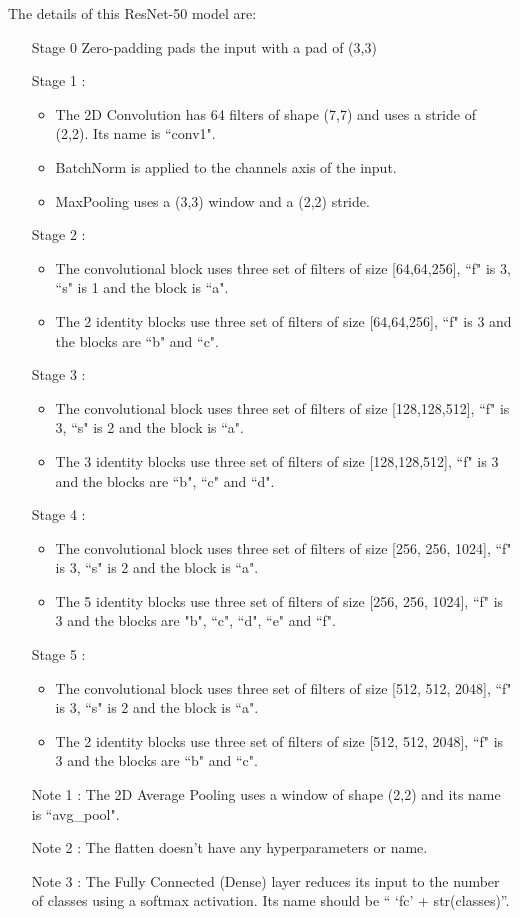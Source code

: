 \noindent The details of this ResNet-50 model are:
\begin{itemize}
\item[Stage 0] Zero-padding pads the input with a pad of (3,3)
\item[Stage 1]:
    \begin{itemize}
    \item The 2D Convolution has 64 filters of shape (7,7) and uses a stride of (2,2). Its name is ``conv1".
    \item BatchNorm is applied to the channels axis of the input.
    \item MaxPooling uses a (3,3) window and a (2,2) stride.
    \end{itemize}
\item[Stage 2]:
    \begin{itemize}
    \item The convolutional block uses three set of filters of size [64,64,256], ``f" is 3, ``s" is 1 and the block is ``a".
    \item The 2 identity blocks use three set of filters of size [64,64,256], ``f" is 3 and the blocks are ``b" and ``c".
    \end{itemize}
\item[Stage 3]:
    \begin{itemize}
    \item The convolutional block uses three set of filters of size [128,128,512], ``f" is 3, ``s" is 2 and the block is ``a".
    \item The 3 identity blocks use three set of filters of size [128,128,512], ``f" is 3 and the blocks are ``b", ``c" and ``d".
    \end{itemize}
\item[Stage 4]:
    \begin{itemize}
    \item The convolutional block uses three set of filters of size [256, 256, 1024], ``f" is 3, ``s" is 2 and the block is ``a".
    \item The 5 identity blocks use three set of filters of size [256, 256, 1024], ``f" is 3 and the blocks are "b", ``c", ``d", ``e" and ``f".
    \end{itemize}
\item[Stage 5]:
    \begin{itemize}
    \item The convolutional block uses three set of filters of size [512, 512, 2048], ``f" is 3, ``s" is 2 and the block is ``a".
    \item The 2 identity blocks use three set of filters of size [512, 512, 2048], ``f" is 3 and the blocks are ``b" and ``c".
    \end{itemize}
\item[Note 1]: The 2D Average Pooling uses a window of shape (2,2) and its name is ``avg\_pool".
\item[Note 2]: The flatten doesn't have any hyperparameters or name.
\item[Note 3]: The Fully Connected (Dense) layer reduces its input to the number of classes using a softmax activation. Its name should be `` `fc' + str(classes)''.
\end{itemize}
